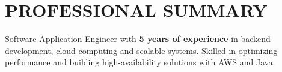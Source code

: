 \section{PROFESSIONAL SUMMARY}
\begin{onecolentry}
    Software Application Engineer with \textbf{5 years of experience} in backend development, cloud computing and scalable systems. Skilled in optimizing performance and building high-availability solutions with AWS and Java.
\end{onecolentry}
